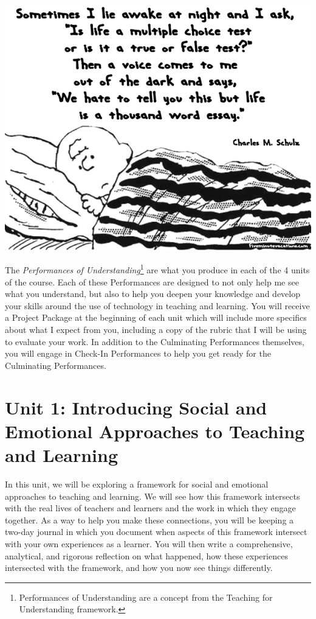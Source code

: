 \documentclass{tufte-handout}
\begin{document}
\begin{marginfigure}%
	\begin{center}
		\includegraphics[width=1\linewidth]{lp-pic.png}
	\end{center}
\end{marginfigure}

 The \textit{Performances of Understanding}\footnote{Performances of Understanding are a concept from the Teaching for Understanding framework.} are what you produce in each of the 4 units of the course. Each of these Performances are designed to not only help me see what you understand, but also to help you deepen your knowledge and develop your skills around the use of technology in teaching and learning. You will receive a \textsf{Project Package} at the beginning of each unit which will include more specifics about what I expect from you, including a copy of the rubric that I will be using to evaluate your work. In addition to the Culminating Performances themselves, you will engage in Check-In Performances to help you get ready for the Culminating Performances.

\section{Unit 1:  Introducing Social and Emotional Approaches to Teaching and Learning}

In this unit, we will be exploring a framework for social and emotional approaches to teaching and learning. We will see how this framework intersects with the real lives of teachers and learners and the work in which they engage together. As a way to help you make these connections, you will be keeping a two-day journal in which you document when aspects of this framework intersect with your own experiences as a learner. You will then write a comprehensive, analytical, and rigorous reflection on what happened, how these experiences intersected with the framework, and how you now see things differently.
\end{document}
